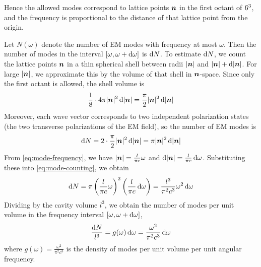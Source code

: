 Hence the allowed modes correspond to lattice points \({\boldsymbol{n}}\) in the first octant of \(6^3\), and the frequency is proportional to the distance of that lattice point from the origin.


Let \(N(\omega)\) denote the number of EM modes with frequency at most \(\omega\).
Then the number of modes in the interval \([\omega,\omega+\mathrm{d}\omega]\) is \(\mathrm{d} N\).
To estimate \(\mathrm{d} N\), we count the lattice points \({\boldsymbol{n}}\) in a thin spherical shell between radii \(|{\boldsymbol{n}}|\) and \(|{\boldsymbol{n}}|+\mathrm{d}|{\boldsymbol{n}}|\).
For large \(|{\boldsymbol{n}}|\), we approximate this by the volume of that shell in \({\boldsymbol{n}}\)-space.
Since only the first octant is allowed, the shell volume is
\[
\frac18 \cdot 4\pi |{\boldsymbol{n}}|^2 \,\mathrm{d} |{\boldsymbol{n}}|
=
\frac{\pi}{2} |{\boldsymbol{n}}|^2 \,\mathrm{d} |{\boldsymbol{n}}|
\]
Moreover, each wave vector corresponds to two independent polarization states (the two transverse polarizations of the EM field),  %
so the number of EM modes is
\begin{equation}\label{eq:mode-counting}
\dif N %
=
2 \cdot \frac{\pi}{2} |\vect{n}|^2 \,\dif |\vect{n}|
=
\pi |\vect{n}|^2 \,\dif |\vect{n}|
\end{equation}
From \eqref{eq:mode-frequency}, we have
\(
|{\boldsymbol{n}}| = \frac{l}{\pi c}\omega
\) and
\(
\mathrm{d} |{\boldsymbol{n}}| = \frac{l}{\pi c}\,\mathrm{d}\omega
\).
Substituting these into \eqref{eq:mode-counting}, we obtain
\[
\mathrm{d} N
=
\pi
\left(\frac{l}{\pi c}\omega\right)^2
\left(\frac{l}{\pi c}\,\mathrm{d}\omega\right)
=
\frac{l^3}{\pi^2 c^3}\omega^2 \,\mathrm{d}\omega
\]
Dividing by the cavity volume \(l^3\), we obtain the number of modes per unit volume in the frequency interval \([\omega,\omega+\mathrm{d}\omega]\),
\[
\frac{\mathrm{d} N}{l^3}
=
g(\omega)\,\mathrm{d}\omega
=
\frac{\omega^2}{\pi^2 c^3}\,\mathrm{d}\omega
\]
where
\(
g(\omega)=\frac{\omega^2}{\pi^2 c^3}
\)
is the density of modes per unit volume per unit angular frequency.


